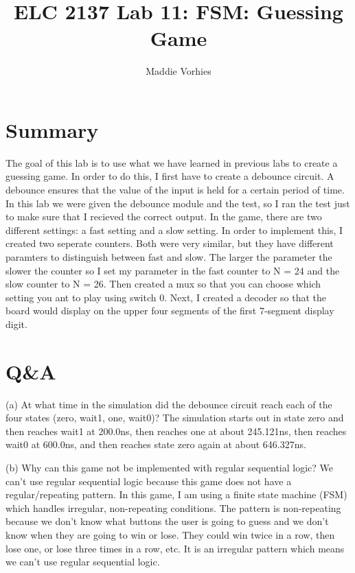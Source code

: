 \documentclass[11pt]{article}
\begin{document}
\title{ELC 2137 Lab 11: FSM: Guessing Game}
\author{Maddie Vorhies}

\maketitle


\section*{Summary}

The goal of this lab is to use what we have learned in previous labs to create a guessing game. In order to do this, I first have to create a debounce circuit. A debounce ensures that the value of the input is held for a certain period of time. In this lab we were given the debounce module and the test, so I ran the test just to make sure that I recieved the correct output. In the game, there are two different settings: a fast setting and a slow setting. In order to implement this, I created two seperate counters. Both were very similar, but they have different paramters to distinguish between fast and slow. The larger the parameter the slower the counter so I set my parameter in the fast counter to N = 24 and the slow counter to N = 26. Then  created a mux so that you can choose which setting you ant to play using switch 0. Next, I created a decoder so that the board would display on the upper four segments of the first 7-segment display digit. 


\section*{Q\&A}

(a) At what time in the simulation did the debounce circuit reach each of the four states (zero, wait1, one, wait0)? \newline
The simulation starts out in state zero and then reaches wait1 at 200.0ns, then reaches one at about 245.121ns, then reaches wait0 at 600.0ns, and then reaches state zero again at about 646.327ns. \newline 

(b) Why can this game not be implemented with regular sequential logic? \newline
 We can't use regular sequential logic because this game does not have a regular/repeating pattern. In this game, I am using a finite state machine (FSM) which handles irregular, non-repeating conditions. The pattern is non-repeating because we don't know what buttons the user is going to guess and we don't know when they are going to win or lose. They could win twice in a row, then lose one, or lose three times in a row, etc. It is an irregular pattern which means we can't use regular sequential logic. \newline
\end{document}
